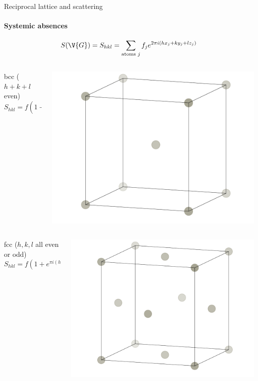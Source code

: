 \documentclass{beamer}
\begin{document}
\begin{frame}{Reciprocal lattice and scattering}
\framesubtitle{Systemic absences}
\begin{equation*}
	S(\V{G}) = S_{hkl} = \sum_{\text{atoms } j} f_j e^{2\pi i(hx_j + ky_j + lz_j)}
\end{equation*}
\pause
\begin{columns}
	\begin{column}{0.7\textwidth}
		bcc ($ h+k+l $ even)
		\begin{equation*}
			S_{hkl} = f (1+ (-1)^{h+k+l})
		\end{equation*}
	\end{column}
	\begin{column}{0.25\textwidth}
		\includegraphics[width=\linewidth]{figures/bcc.pdf}
	\end{column}
\end{columns}
\pause
\begin{columns}
	\begin{column}{0.7\textwidth}
		fcc ($ h,k,l $ all even or odd)
		\begin{equation*}
		S_{hkl} = f (1+ e^{\pi i(h+k)} + e^{\pi i(k+l)} + e^{\pi i(h+l)})
		\end{equation*}
	\end{column}
	\begin{column}{0.25\textwidth}
		\includegraphics[width=\linewidth]{figures/fcc.pdf}

\end{column}
\end{columns}
\end{frame}
\end{document}
